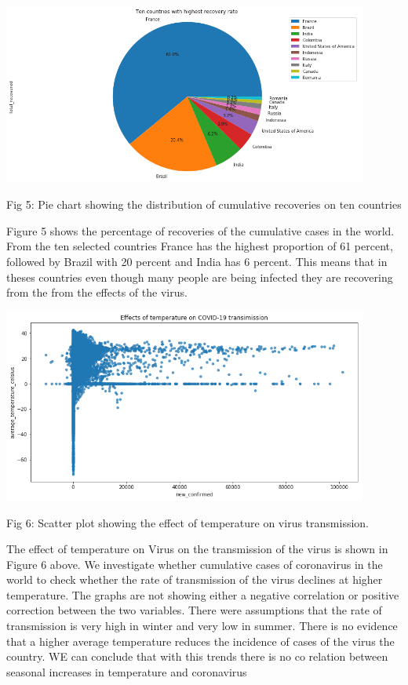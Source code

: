 \documentclass[12pt]{article}
\begin{document}
\centering
\includegraphics[width=0.9\textwidth, inner]{pie1.png}
\caption{Fig 5: Pie chart showing the distribution of cumulative recoveries on ten countries}


Figure 5 shows the percentage of recoveries of the cumulative cases in the world. From the ten selected countries France has the highest proportion of 61 percent, followed by Brazil with 20 percent and India has 6 percent. This means that in theses countries even though many people are being infected they are recovering from the from the effects of the virus.

\centering
\includegraphics[width=0.9\textwidth, inner]{scatter.png}
\caption{Fig 6: Scatter plot showing the effect of temperature on virus transmission.}

The effect of temperature on Virus on the transmission of the virus is shown in Figure 6 above.
We investigate whether cumulative  cases of coronavirus in the world to check whether the rate of transmission of the virus declines at higher temperature. The graphs are not showing either a negative correlation or positive correction between the two variables. There were assumptions that the rate of transmission is very high in winter and very low in summer. There is no evidence  that a higher average temperature reduces the incidence of cases of the virus the country. WE can conclude that with this trends there is no co relation between seasonal increases in temperature and coronavirus 
\end{document}
